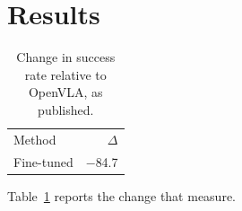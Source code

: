\documentclass{article}
\begin{document}
\section{Results}
\begin{table}[t]
\centering
\caption{Change in success rate relative to OpenVLA, as published.}
\label{tab:d}
\begin{tabular}{lr}
Method & $\Delta$ \\
Fine-tuned & $-$84.7 \\
\end{tabular}
\end{table}

Table~\ref{tab:d} reports the change that \citet{kim} measure.



\end{document}
